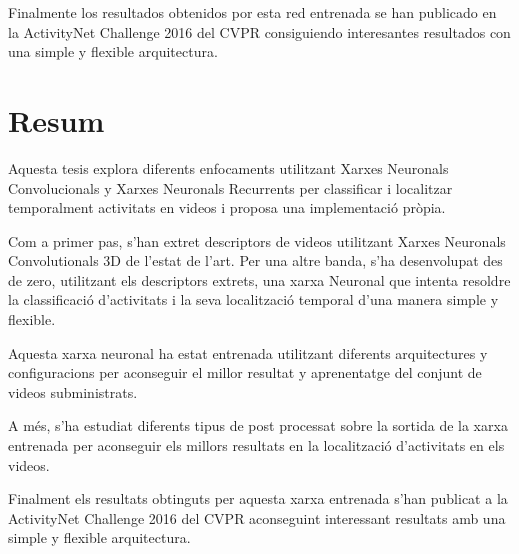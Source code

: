 Finalmente los resultados obtenidos por esta red entrenada se han publicado en la ActivityNet Challenge 2016 del CVPR consiguiendo interesantes resultados con una simple y flexible arquitectura.

\chapter*{Resum}

Aquesta tesis explora diferents enfocaments utilitzant Xarxes Neuronals Convolucionals y Xarxes Neuronals Recurrents per classificar i localitzar temporalment activitats en videos i proposa una implementació pròpia.

Com a primer pas, s'han extret descriptors de videos utilitzant Xarxes Neuronals Convolutionals 3D de l'estat de l'art. Per una altre banda, s'ha desenvolupat des de zero, utilitzant els descriptors extrets, una xarxa Neuronal que intenta resoldre la classificació d'activitats i la seva localització temporal d'una manera simple y flexible.

Aquesta xarxa neuronal ha estat entrenada utilitzant diferents arquitectures y configuracions per aconseguir el millor resultat y aprenentatge del conjunt de videos subministrats.

A més, s'ha estudiat diferents tipus de post processat sobre la sortida de la xarxa entrenada per aconseguir els millors resultats en la localització d'activitats en els videos.

Finalment els resultats obtinguts per aquesta xarxa entrenada s'han publicat a la ActivityNet Challenge 2016 del CVPR aconseguint interessant resultats amb una simple y flexible arquitectura.
